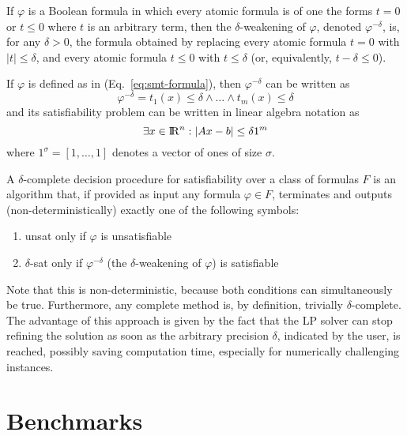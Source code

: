 \documentclass[runningheads]{llncs}
\begin{document}
\begin{definition}
    If $\varphi$ is a Boolean formula in which every atomic formula is of one the forms $t = 0$ or $t \le 0$ where $t$ is an arbitrary term, then the $\delta$-weakening of $\varphi$, denoted $\varphi^{-\delta}$, is, for any $\delta > 0$, the formula obtained by replacing every atomic formula $t = 0$ with $|t| \le \delta$, and every atomic formula $t \le 0$ with $t \le \delta$ (or, equivalently, $t - \delta \le 0$).
\end{definition}
If $\varphi$ is defined as in (Eq.~\ref{eq:smt-formula}), then $\varphi^{-\delta}$ can be written as
\begin{equation*}
    \varphi^{-\delta} = t_1(x) \le \delta \land \ldots \land t_m(x) \le \delta
\end{equation*}
and its satisfiability problem can be written in linear algebra notation as
\begin{equation}
    \label{eq:delta-sat}
    \exists x \in {\rm I\!R}^n : |Ax - b| \le \delta 1^m
\end{equation}
where $1^\sigma = [1, \ldots, 1]$ denotes a vector of ones of size $\sigma$.
\begin{definition}
    A $\delta$-complete decision procedure for satisfiability over a class of formulas $F$ is an algorithm that, if provided as input any formula $\varphi \in F$, terminates and outputs (non-deterministically) exactly one of the following symbols:
    \begin{enumerate}
        \item unsat only if $\varphi$ is unsatisfiable
        \item $\delta$-sat only if $\varphi^{-\delta}$ (the $\delta$-weakening of $\varphi$) is satisfiable
    \end{enumerate}
\end{definition}
Note that this is non-deterministic, because both conditions can simultaneously be true.
Furthermore, any complete method is, by definition, trivially $\delta$-complete.
The advantage of this approach is given by the fact that the LP solver can stop refining the solution as soon as the arbitrary precision $\delta$, indicated by the user, is reached, possibly saving computation time, especially for numerically challenging instances.

\section{Benchmarks}
\end{document}
